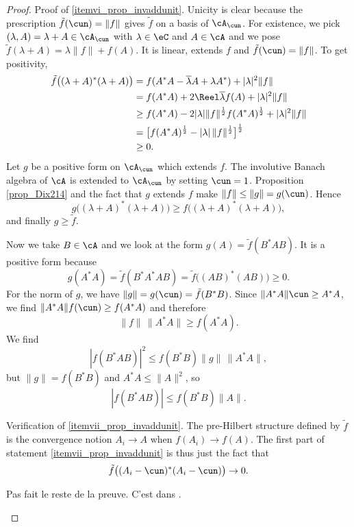 \begin{proof}
Proof of \ref{itemvi_prop_invaddunit}. Unicity is clear because the prescription $\tilde f(\cun)=\| f \|$ gives $\tilde f$ on a basis of $\cA_{\cun}$. For existence, we pick $(\lambda,A)=\lambda+A\in\cA_{\cun}$ with $\lambda\in\eC$ and $A\in\cA$ and we pose $\tilde f(\lambda+A)=\lambda\| f \|+f(A)$. It is linear, extends $f$ and $\tilde f(\cun)=\| f \|$. To get positivity,
\begin{equation}
\begin{split}
 \tilde f\big( (\lambda+A)^*(\lambda+A) \big)&=f(A^*A-\overline{ \lambda }A+\lambda A^*)+| \lambda |^2\| f \|\\
        &=f(A^*A)+2\Reel\overline{ \lambda }f(A)+| \lambda |^2\| f \|\\
        &\geq f(A^*A)-2| \lambda |\| f \|^{\frac{ 1 }{2}}f(A^*A)^{\frac{ 1 }{2}}+| \lambda |^2\| f \|\\
        &=\big[ f(A^*A)^{\frac{ 1 }{2}}-| \lambda |\,\| f \|^{\frac{ 1 }{2}} \big]^{\frac{ 1 }{2}}\\&\geq 0.
\end{split}
\end{equation}
Let $g$ be a positive form on $\cA_{\cun}$ which extends $f$. The involutive Banach algebra of $\cA$ is extended to $\cA_{\cun}$ by setting $\cun=1$. Proposition \ref{prop_Dix214} and the fact that $g$ extends $f$ make $\| f \|\leq\| g \|=g(\cun)$. Hence
\[ 
  g\big( (\lambda+A)^*(\lambda+A) \big)\geq f\big( (\lambda+A)^*(\lambda+A) \big),
\]
and finally $g\geq\tilde f$.

Now we take $B\in\cA$ and we look at the form $g(A)=\tilde f(B^*AB)$. It is a positive form because
\[ 
  g(A^*A)=\tilde f(B^*A^*AB)=\tilde f\big( (AB)^*(AB) \big)\geq 0.
\]
For the norm of $g$, we have $\| g \|=g(\cun)=\tilde f(B^*B)$. Since $\| A^*A \|\cun\geq A^*A$, we find $\| A^*A \|f(\cun)\geq f(A^*A)$ and therefore
\[ 
  \| f \|\,\| A^*A \|\geq f(A^*A).
\]
We find
\[ 
  | f(B^*AB) |^2\leq f(B^*B)\| g \|\,\| A^*A \|,
\]
but $\| g \|=f(B^*B)$ and $A^*A\leq\| A \|^2$, so
\begin{equation}
| f(B^*AB) |\leq f(B^*B)\| A \|.
\end{equation}

Verification of \ref{itemvii_prop_invaddunit}. The pre-Hilbert structure defined by $\tilde f$ is the convergence notion $A_i\to A$ when $f(A_i)\to f(A)$. The first part of statement \ref{itemvii_prop_invaddunit} is thus just the fact that
\[ 
  \tilde f\big( (A_i-\cun)^*(A_i-\cun) \big)\to 0.
\]
\begin{probleme}
Pas fait le reste de la preuve. C'est dans \cite{Dixmier}.
\end{probleme}

\end{proof}


